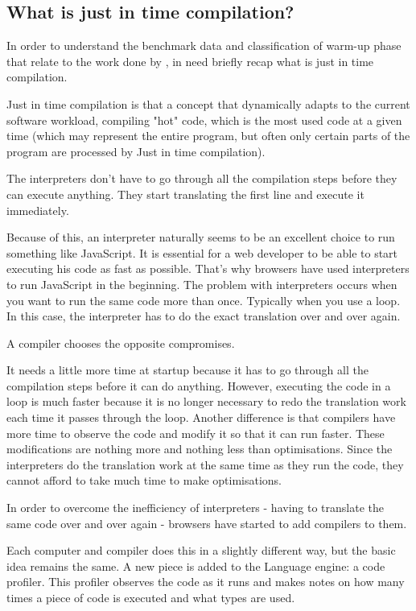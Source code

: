 \documentclass{article}
\begin{document}
\subsection{What is just in time compilation? }


In order to understand the benchmark data and classification of warm-up phase that relate to the work done by \citep{barrett2017virtual}, in need briefly recap what is just in time compilation.

Just in time compilation \citep{aycock2003brief} is that a concept that dynamically adapts to the current software workload, compiling "hot" code, which is the most used code at a given time (which may represent the entire program, but often only certain parts of the program are processed by Just in time compilation).

The interpreters don't have to go through all the compilation steps before they can execute anything. They start translating the first line and execute it immediately.

Because of this, an interpreter naturally seems to be an excellent choice to run something like JavaScript. It is essential for a web developer to be able to start executing his code as fast as possible. That's why browsers have used interpreters to run JavaScript in the beginning.
The problem with interpreters occurs when you want to run the same code more than once. Typically when you use a loop. In this case, the interpreter has to do the exact translation over and over again.

A compiler chooses the opposite compromises.

It needs a little more time at startup because it has to go through all the compilation steps before it can do anything. However, executing the code in a loop is much faster because it is no longer necessary to redo the translation work each time it passes through the loop.
Another difference is that compilers have more time to observe the code and modify it so that it can run faster. These modifications are nothing more and nothing less than optimisations. Since the interpreters do the translation work at the same time as they run the code, they cannot afford to take much time to make optimisations.

In order to overcome the inefficiency of interpreters - having to translate the same code over and over again - browsers have started to add compilers to them.

Each computer and compiler does this in a slightly different way, but the basic idea remains the same. A new piece is added to the Language engine: a code profiler. This profiler observes the code as it runs and makes notes on how many times a piece of code is executed and what types are used.
\end{document}
